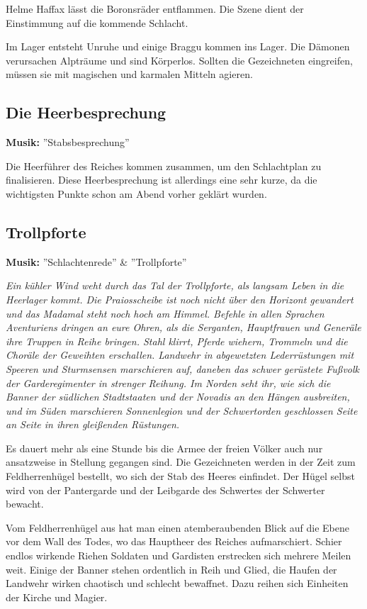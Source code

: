 Helme Haffax lässt die Boronsräder entflammen. Die Szene dient der Einstimmung auf die kommende Schlacht.

Im Lager entsteht Unruhe und einige Braggu kommen ins Lager. Die Dämonen verursachen Alpträume und sind Körperlos. Sollten die Gezeichneten eingreifen, müssen sie mit magischen und karmalen Mitteln agieren.

\subsection{Die Heerbesprechung}
\textbf{Musik:} ''Stabsbesprechung''
 
Die Heerführer des Reiches kommen zusammen, um den Schlachtplan zu finalisieren. Diese Heerbesprechung ist allerdings eine sehr kurze, da die wichtigsten Punkte schon am Abend vorher geklärt wurden.

\subsection{Trollpforte}
\textbf{Musik:} ''Schlachtenrede'' \& ''Trollpforte''

\emph{Ein kühler Wind weht durch das Tal der Trollpforte, als langsam Leben in die Heerlager kommt. Die Praiosscheibe ist noch nicht über den Horizont gewandert und das Madamal steht noch hoch am Himmel. Befehle in allen Sprachen Aventuriens dringen an eure Ohren, als die Serganten, Hauptfrauen und Generäle ihre Truppen in Reihe bringen. Stahl klirrt, Pferde wiehern, Trommeln und die Choräle der Geweihten erschallen. Landwehr in abgewetzten Lederrüstungen mit Speeren und Sturmsensen marschieren auf, daneben das schwer gerüstete Fußvolk der Garderegimenter in strenger Reihung. Im Norden seht ihr, wie sich die Banner der südlichen Stadtstaaten und der Novadis an den Hängen ausbreiten, und im Süden marschieren Sonnenlegion und der Schwertorden geschlossen Seite an Seite in ihren gleißenden Rüstungen.}

Es dauert mehr als eine Stunde bis die Armee der freien Völker auch nur ansatzweise in Stellung gegangen sind. Die Gezeichneten werden in der Zeit zum Feldherrenhügel bestellt, wo sich der Stab des Heeres einfindet. Der Hügel selbst wird von der Pantergarde und der Leibgarde des Schwertes der Schwerter bewacht.

Vom Feldherrenhügel aus hat man einen atemberaubenden Blick auf die Ebene vor dem Wall des Todes, wo das Hauptheer des Reiches aufmarschiert. Schier endlos wirkende Riehen Soldaten und Gardisten erstrecken sich mehrere Meilen weit. Einige der Banner stehen ordentlich in Reih und Glied, die Haufen der Landwehr wirken chaotisch und schlecht bewaffnet. Dazu reihen sich Einheiten der Kirche und Magier.

